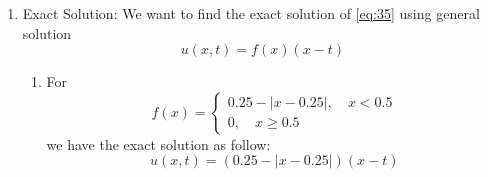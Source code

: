 \documentclass[a4paper,12pt]{article}
\begin{document}
\begin{enumerate}
	\item Exact Solution: We want to find the exact solution of \eqref{eq:35} using general solution $$u(x,t) = f(x)(x-t)$$
	\begin{enumerate}
		\item For \begin{equation*}
		f(x) = \begin{cases}
		0.25 - |x - 0.25|, \quad x<0.5\\
		0, \quad x\geq0.5
		\end{cases}
		\end{equation*} we have the exact solution as follow:
		\begin{equation}
		u(x,t) = (0.25-|x-0.25|)(x-t)
		\end{equation}
		

\end{enumerate}
\end{enumerate}
\end{document}
